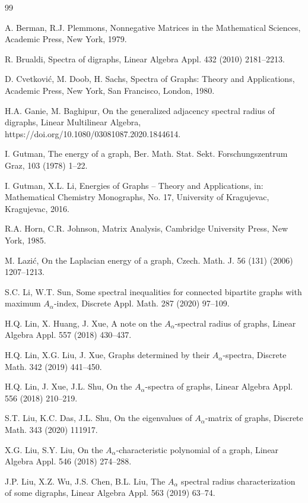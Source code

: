 \documentclass[11pt]{article}
\begin{document}
\begin{thebibliography}{99}

 A. Berman, R.J. Plemmons, Nonnegative Matrices in the Mathematical Sciences, Academic Press, New York, 1979.

 R. Brualdi, Spectra of digraphs, Linear Algebra Appl. 432 (2010) 2181--2213.

 D. Cvetkovi\'{c}, M. Doob, H. Sachs, Spectra of Graphs: Theory and Applications, Academic Press, New York, San Francisco, London, 1980.

 H.A. Ganie, M. Baghipur, On the generalized adjacency spectral radius of digraphs, Linear Multilinear Algebra, https://doi.org/10.1080/03081087.2020.1844614.

 I. Gutman, The energy of a graph, Ber. Math. Stat. Sekt. Forschungszentrum Graz, 103 (1978) 1--22.

 I. Gutman, X.L. Li, Energies of Graphs -- Theory and Applications, in: Mathematical Chemistry Monographs, No. 17, University of Kragujevac, Kragujevac, 2016.

 R.A. Horn, C.R. Johnson, Matrix Analysis, Cambridge University Press, New York, 1985.

 M. Lazi\'{c}, On the Laplacian energy of a graph, Czech. Math. J. 56 (131) (2006) 1207--1213.

 S.C. Li, W.T. Sun, Some spectral inequalities for connected bipartite graphs with maximum $A_\alpha$-index,
Discrete Appl. Math. 287 (2020) 97--109.

 H.Q. Lin, X. Huang, J. Xue, A note on the $A_\alpha$-spectral radius of graphs, Linear Algebra Appl. 557 (2018) 430--437.

 H.Q. Lin, X.G. Liu, J. Xue, Graphs determined by their $A_\alpha$-spectra, Discrete Math. 342 (2019) 441--450.

 H.Q. Lin, J. Xue, J.L. Shu, On the $A_\alpha$-spectra of graphs, Linear Algebra Appl. 556 (2018) 210--219.

 S.T. Liu, K.C. Das, J.L. Shu, On the eigenvalues of $A_\alpha$-matrix of graphs, Discrete Math. 343 (2020) 111917.

 X.G. Liu, S.Y. Liu, On the $A_\alpha$-characteristic polynomial of a graph, Linear Algebra Appl. 546 (2018) 274--288.

 J.P. Liu, X.Z. Wu, J.S. Chen, B.L. Liu, The $A_\alpha$ spectral radius characterization of some digraphs, Linear Algebra Appl. 563 (2019) 63--74.


\end{thebibliography}
\end{document}
